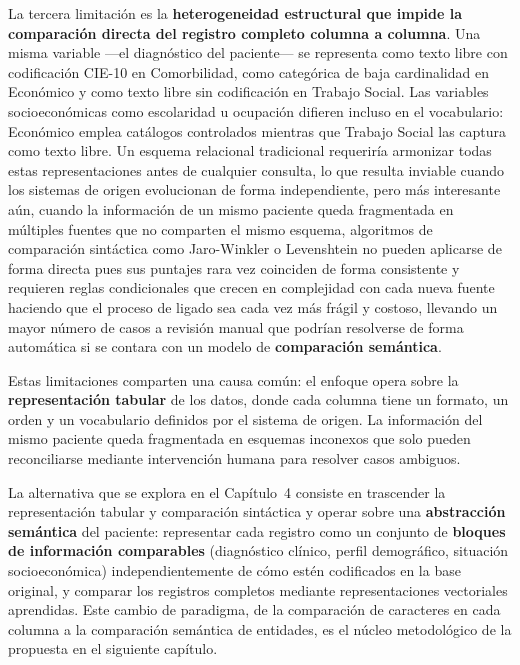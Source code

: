La tercera limitación es la \textbf{heterogeneidad estructural que impide la comparación directa del registro completo columna a columna}. Una misma variable ---el diagnóstico del paciente--- se representa como texto libre con codificación CIE-10 en Comorbilidad, como categórica de baja cardinalidad en Económico y como texto libre sin codificación en Trabajo Social. Las variables socioeconómicas como escolaridad u ocupación difieren incluso en el vocabulario: Económico emplea catálogos controlados mientras que Trabajo Social las captura como texto libre. Un esquema relacional tradicional requeriría armonizar todas estas representaciones antes de cualquier consulta, lo que resulta inviable cuando los sistemas de origen evolucionan de forma independiente, pero más interesante aún, cuando la información de un mismo paciente queda fragmentada en múltiples fuentes que no comparten el mismo esquema, algoritmos de comparación sintáctica como Jaro-Winkler o Levenshtein no pueden aplicarse de forma directa pues sus puntajes rara vez coinciden de forma consistente y requieren reglas condicionales que crecen en complejidad con cada nueva fuente haciendo que el proceso de ligado sea cada vez más frágil y costoso, llevando un mayor número de casos a revisión manual que podrían resolverse de forma automática si se contara con un modelo de \textbf{comparación semántica}.

Estas limitaciones comparten una causa común: el enfoque opera sobre la \textbf{representación tabular} de los datos, donde cada columna tiene un formato, un orden y un vocabulario definidos por el sistema de origen. La información del mismo paciente queda fragmentada en esquemas inconexos que solo pueden reconciliarse mediante  intervención humana para resolver casos ambiguos.

La alternativa que se explora en el Capítulo~4 consiste en trascender la representación tabular y comparación sintáctica y operar sobre una \textbf{abstracción semántica} del paciente: representar cada registro como un conjunto de \textbf{bloques de información comparables} (diagnóstico clínico, perfil demográfico, situación socioeconómica) independientemente de cómo estén codificados en la base original, y comparar los registros completos mediante representaciones vectoriales aprendidas. Este cambio de paradigma, de la comparación de caracteres en cada columna a la comparación semántica de entidades, es el núcleo metodológico de la propuesta en el siguiente capítulo.